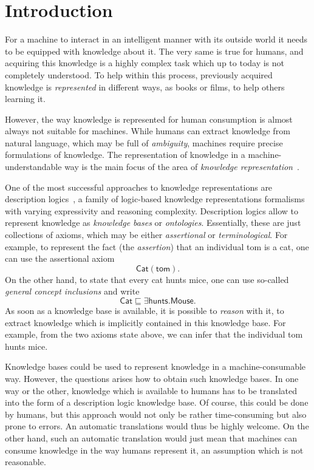 \chapter{Introduction}
\label{cha:introduction}

For a machine to interact in an intelligent manner with its outside world it needs to be
equipped with knowledge about it.  The very same is true for humans, and acquiring this
knowledge is a highly complex task which up to today is not completely understood.  To
help within this process, previously acquired knowledge is \emph{represented} in different
ways, \eg as books or films, to help others learning it.

However, the way knowledge is represented for human consumption is almost always not
suitable for machines.  While humans can extract knowledge from natural language, which
may be full of \emph{ambiguity}, machines require precise formulations of knowledge.  The
representation of knowledge in a machine-understandable way is the main focus of the area
of \emph{knowledge representation}~\cite{KRhandbook}.

One of the most successful approaches to knowledge representations are description
logics~\cite{DLhandbook}, a family of logic-based knowledge representations formalisms
with varying expressivity and reasoning complexity.  Description logics allow to represent
knowledge as \emph{knowledge bases} or \emph{ontologies}.  Essentially, these are just
collections of axioms, which may be either \emph{assertional} or \emph{terminological}.
For example, to represent the fact (the \emph{assertion}) that an individual \textsf{tom}
is a cat, one can use the assertional axiom
\begin{equation}
  \label{eq:14}
  \mathsf{Cat}(\mathsf{tom}).
\end{equation}
On the other hand, to state that every cat hunts mice, one can use so-called \emph{general
concept inclusions} and write
\begin{equation}
  \label{eq:15}
  \mathsf{Cat} \sqsubseteq \exists \mathsf{hunts}. \mathsf{Mouse}.
\end{equation}
As soon as a knowledge base is available, it is possible to \emph{reason} with it, \ie to
extract knowledge which is implicitly contained in this knowledge base.  For example, from
the two axioms state above, we can infer that the individual \textsf{tom} hunts mice.

Knowledge bases could be used to represent knowledge in a machine-consumable way.
However, the questions arises how to obtain such knowledge bases.  In one way or the
other, knowledge which is available to humans has to be translated into the form of a
description logic knowledge base.  Of course, this could be done by humans, but this
approach would not only be rather time-consuming but also prone to errors.  An automatic
translations would thus be highly welcome.  On the other hand, such an automatic
translation would just mean that machines can consume knowledge in the way humans
represent it, an assumption which is not reasonable.

